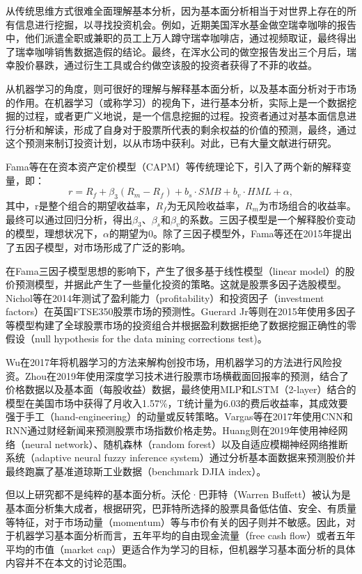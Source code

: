 \documentclass[twoside,longtitle]{LZUthesis}
\begin{document}
从传统思维方式很难全面理解基本分析，因为基本面分析相当于对世界上存在的所有信息进行挖掘，以寻找投资机会。例如，近期美国浑水基金做空瑞幸咖啡的报告中，他们派遣全职或兼职的员工上万人蹲守瑞幸咖啡店，通过视频取证，最终得出了瑞幸咖啡销售数据造假的结论。最终，在浑水公司的做空报告发出三个月后，瑞幸股价暴跌，通过衍生工具或合约做空该股的投资者获得了不菲的收益。

从机器学习的角度，则可很好的理解与解释基本面分析，以及基本面分析对于市场的作用。在机器学习（或称学习）的视角下，进行基本分析，实际上是一个数据挖掘的过程，或者更广义地说，是一个信息挖掘的过程。投资者通过对基本面信息进行分析和解读，形成了自身对于股票所代表的剩余权益的价值的预测，最终，通过这个预测来制订投资计划，以从市场中获利。对此，已有大量文献进行研究。

Fama等在\cite{fama1993common}在资本资产定价模型（CAPM）等传统理论下，引入了两个新的解释变量，即：
\[
r=R_f+\beta_3(R_m-R_f)+b_s\cdot SMB+b_v\cdot HML+\alpha,
\]
其中，r是整个组合的期望收益率，$R_f$为无风险收益率，$R_m$为市场组合的收益率。最终可以通过回归分析，得出$\beta_3$、$\beta_s$和$\beta_v$的系数。三因子模型是一个解释股价变动的模型，理想状况下，$\alpha$的期望为0。除了三因子模型外，Fama等还在2015年提出了五因子模型，对市场形成了广泛的影响。

在Fama三因子模型思想的影响下，产生了很多基于线性模型（linear model）的股价预测模型，并据此产生了一些量化投资的策略。这就是股票多因子选股模型。Nichol等在2014年测试了盈利能力（profitability）和投资因子（investment factors）在英国FTSE350股票市场的预测性\cite{nichol2014profitability}。Guerard Jr等则在2015年使用多因子等模型构建了全球股票市场的投资组合并根据盈利数据拒绝了数据挖掘正确性的零假设（null hypothesis for the data mining corrections test)。

Wu在2017年将机器学习的方法来解构创投市场，用机器学习的方法进行风险投资\cite{wu2017machine}。Zhou在2019年使用深度学习技术进行股票市场横截面回报率的预测，结合了价格数据以及基本面（每股收益）数据，最终使用MLP和LSTM（2-layer）结合的模型在美国市场中获得了月收入1.57\%，T统计量为6.03的费后收益率，其成效要强于手工（hand-engineering）的动量或反转策略\cite{zhou2019deep}。Vargas等在2017年使用CNN和RNN通过财经新闻来预测股票市场指数价格走势\cite{vargas2017deep}。Huang则在2019年使用神经网络（neural network）、随机森林（random forest）以及自适应模糊神经网络推断系统（adaptive neural fuzzy inference system）通过分析基本面数据来预测股价并最终跑赢了基准道琼斯工业数据（benchmark DJIA index）。

但以上研究都不是纯粹的基本面分析。沃伦·巴菲特（Warren Buffett）被认为是基本面分析集大成者，根据研究\cite{frazzini2013buffett}，巴菲特所选择的股票具备低估值、安全、有质量等特征，对于市场动量（momentum）等与市价有关的因子则并不敏感。因此，对于机器学习基本面分析而言，五年平均的自由现金流量（free cash flow）或者五年平均的市值（market cap）更适合作为学习的目标，但机器学习基本面分析的具体内容并不在本文的讨论范围。
\end{document}
